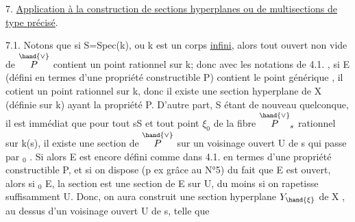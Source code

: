 


7. \uline{Application à la construction de sections hyperplanes ou de multisections
de type précisé}.

7.1. Notons que si S=Spec(k), ou k est un corps \uline{infini}, alors tout ouvert
non vide de $\overset{\hand{\vee}}{P}$ contient un point rationnel sur k; donc avec les notations de
4.1. , si E (défini en termes d'une propriété constructible P) contient
le point générique \hand{$\eta$} , il cotient  un point rationnel sur k, donc
il existe une section hyperplane de X (définie sur k) ayant la propriété P.
D'autre part, S étant de nouveau quelconque, il est immédiat que pour tout
s\hand{$\in$}S et tout point $\xi_0$ de la fibre $\overset{\hand{\vee}}{P}_s$ rationnel sur k(s), il existe une section
\hand{$\xi$} de $\overset{\hand{\vee}}{P}$ sur un voisinage ouvert U de s qui passe par \hand{$\xi$}$_0$ . Si alors E est
encore  défini comme dans 4.1. en termes d'une propriété constructible
P, et si on dispose (p ex grâce au N°5) du fait que E est ouvert, alors
si \hand{$\xi$}$_0$\hand{$\in$} E,  la section \hand{$\xi$} est une section de E sur 
U, du moins si on rapetisse suffisamment U. Donc, on aura construit une
section hyperplane $Y_{\hand{\xi}}$ de X , au dessus d'un voisinage ouvert U de s, telle que

